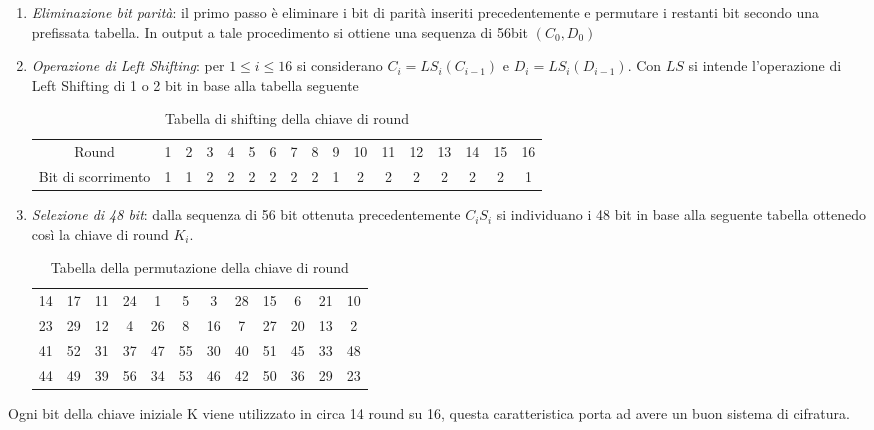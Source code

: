 \documentclass[11pt, a4paper, oneside]{Thesis} %
\begin{document}
\begin{enumerate}
 \item \textit{Eliminazione bit parità}: il primo passo è eliminare i bit di parità inseriti precedentemente e permutare i restanti bit secondo una prefissata tabella. 
 In output a tale procedimento si ottiene una sequenza di 56bit $(C_0,D_0)$ 
 \item \textit{Operazione di Left Shifting}: per $1\le i \le 16$ si considerano $C_i=LS_i(C_{i-1})$ e $D_i=LS_i(D_{i-1})$. Con $LS$ si intende l'operazione di Left Shifting 
 di 1 o 2 bit in base alla tabella seguente
 \begin{table}[ht] 
      \caption{Tabella di shifting della chiave di round} %
      \centering %
      \begin{tabular}{c c c c c c c c c c c c c c c c c} %
      \hline %
      Round & 1 & 2 & 3 & 4 & 5 & 6 & 7 & 8 & 9 & 10 & 11 & 12 & 13 & 14 & 15 & 16\\
      Bit di scorrimento & 1 & 1 & 2 & 2 & 2 & 2 & 2 & 2 & 1 & 2 & 2 & 2 & 2 & 2 & 2 & 1\\           
      \hline %
      \end{tabular} 
      \label{table:tabShiftingKey} %
      \end{table}

 \item \textit{Selezione di 48 bit}: dalla sequenza di 56 bit ottenuta precedentemente $C_iS_i$ si individuano i 48 bit in base alla seguente tabella ottenedo così la chiave di round $K_i$.
 \begin{table}[ht] 
      \caption{Tabella della permutazione della chiave di round} %
      \centering %
      \begin{tabular}{c c c c c c c c c c c c} %
      \hline %
      14 & 17 & 11 & 24 &  1 &  5 &  3 & 28 & 15 &  6 & 21 & 10 \\
      23 & 29 & 12 &  4 & 26 &  8 & 16 &  7 & 27 & 20 & 13 &  2 \\       
      41 & 52 & 31 & 37 & 47 & 55 & 30 & 40 & 51 & 45 & 33 & 48 \\
      44 & 49 & 39 & 56 & 34 & 53 & 46 & 42 & 50 & 36 & 29 & 23 \\       
      \hline %
      \end{tabular} 
      \label{table:tabPermutationKey} %
      \end{table}
 
\end{enumerate}
Ogni bit della chiave iniziale K viene utilizzato in circa 14 round su 16, questa caratteristica porta ad avere un buon sistema di cifratura.
\end{document}
